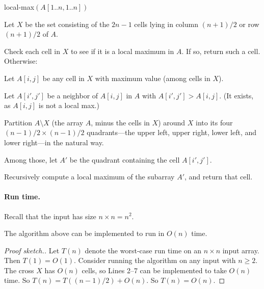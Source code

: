 \begin{myframed}\small
  \begin{steps}
  \item[] {\sf local-max}$(A[1..n, 1..n])$ 

    \step Let $X$ be the set consisting of the $2n-1$ cells lying in column $(n+1)/2$ or row $(n+1)/2$ of $A$.

    \step Check each cell in $X$ to see if it is a local maximum in $A$.  If so, return such a cell.  Otherwise:

    \step Let $A[i, j]$ be any cell in $X$ with maximum value (among cells in $X$).

    \step Let $A[i', j']$ be a neighbor of $A[i,j]$ in $A$ with $A[i', j'] > A[i,j]$.  (It exists, as $A[i,j]$ is not a local max.)

    \step Partition $A \setminus X$ (the array $A$, minus the cells in $X$) around $X$ into its four
    $(n-1)/2 \times (n-1)/2$ quadrants---the upper left, upper right, lower left, and lower right---in the natural way.

    \step Among those, let $A'$ be the quadrant containing the cell $A[i', j']$.

    \step Recursively compute a local maximum of the subarray $A'$, and return that cell.
  \end{steps}
\end{myframed}

\paragraph{Run time.}
Recall that the input has size $n\times n = n^2$.

\begin{lemma}
  The algorithm above can be implemented to run in $O(n)$ time.
\end{lemma}
\begin{proof}[Proof sketch.]
  Let $T(n)$ denote the worst-case run time on an $n\times n$ input array.
  Then $T(1) = O(1)$.
  Consider running the algorithm on any input with $n\ge 2$.
  The cross $X$ has $O(n)$ cells, so Lines 2--7 can be implemented to take $O(n)$ time.
  So $T(n) = T((n-1)/2) + O(n)$.
  So $T(n) = O(n)$.
\end{proof}

